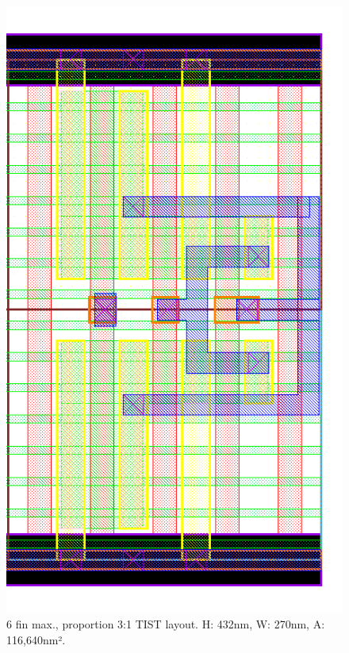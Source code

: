 \documentclass[diss,pgmicro,english]{iiufrgs}
\begin{document}
\begin{figure}[]
\centering
\includegraphics[width=\textwidth,height=\textheight,keepaspectratio]{TIST6F2F.png}
\caption{6 fin max., proportion 3:1 TIST layout. H: 432nm, W: 270nm, A: 116,640nm².}
\label{fig:TIST4F}
\end{figure}
\end{document}
